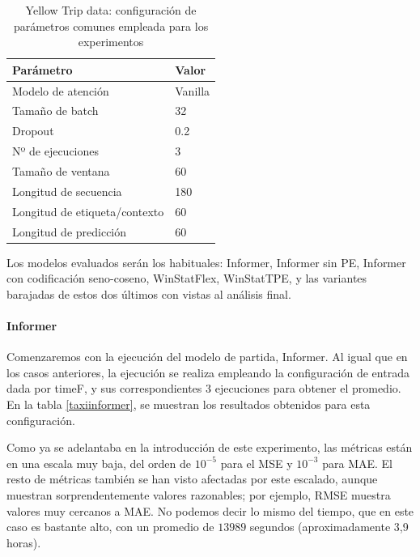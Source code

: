 \begin{table}[!ht]
	\centering
	\begin{tabular}{l|l}
		\toprule
		Parámetro & Valor \\
		\midrule
		{Modelo de atención} & Vanilla \\
		{Tamaño de batch} & 32 \\
		{Dropout} & 0.2 \\
		{Nº de ejecuciones} & 3 \\
		{Tamaño de ventana} & 60 \\
		{Longitud de secuencia} & 180 \\
		{Longitud de etiqueta/contexto} & 60 \\
		{Longitud de predicción} & 60 \\
		\bottomrule
	\end{tabular}
	\caption{Yellow Trip data: configuración de parámetros comunes empleada para los experimentos}
	\label{ajustestaxi}
\end{table}

Los modelos evaluados serán los habituales: Informer, Informer sin PE, Informer con codificación seno-coseno, WinStatFlex, WinStatTPE, y las variantes barajadas de estos dos últimos con vistas al análisis final.

\paragraph{Informer}

Comenzaremos con la ejecución del modelo de partida, Informer. Al igual que en los casos anteriores, la ejecución se realiza empleando la configuración de entrada dada por timeF, y sus correspondientes 3 ejecuciones para obtener el promedio. En la tabla \ref{taxiinformer}, se muestran los resultados obtenidos para esta configuración. 

Como ya se adelantaba en la introducción de este experimento, las métricas están en una escala muy baja, del orden de $10^{-5}$ para el MSE y $10^{-3}$ para MAE. El resto de métricas también se han visto afectadas por este escalado, aunque muestran sorprendentemente valores razonables; por ejemplo, RMSE muestra valores muy cercanos a MAE. No podemos decir lo mismo del tiempo, que en este caso es bastante alto, con un promedio de $13989$ segundos (aproximadamente 3,9 horas).

